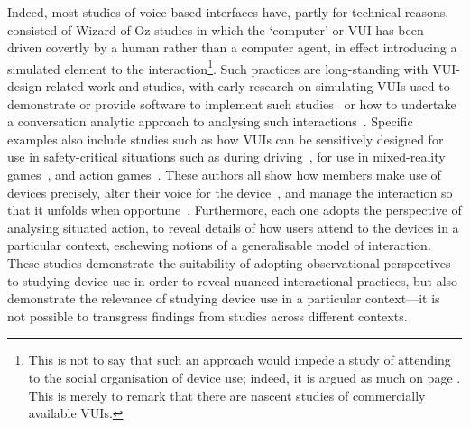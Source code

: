 Indeed, most studies of voice-based interfaces have, partly for technical reasons, consisted of Wizard of Oz studies in which the `computer' or \acf{VUI} has been driven covertly by a human rather than a computer agent, in effect introducing a simulated element to the interaction\footnote{This is not to say that such an approach would impede a study of attending to the social organisation of device use; indeed, it is argued as much on page \pageref{line:labsettings}. This is merely to remark that there are nascent studies of commercially available \acp{VUI}.}.
Such practices are long-standing with \ac{VUI}-design related work and studies, with early research on simulating \acp{VUI} used to demonstrate or provide software to implement such studies~\citep{Klemmer2000} or how to undertake a conversation analytic approach to analysing such interactions~\citep{Fraser1991,Wooffitt1994,Wooffitt1997}.
Specific examples also include studies such as how \acp{VUI} can be sensitively designed for use in safety-critical situations such as during driving~\citep{Martelaro2017}, for use in mixed-reality games~\citep{Dow2005}, and action games~\citep{Hoysniemi2004}.
These authors all show how members make use of devices precisely, alter their voice for the device~\citep{Pelikan2016}, and manage the interaction so that it unfolds when opportune~\citep{Martelaro2017}.
Furthermore, each one adopts the perspective of analysing situated action, to reveal details of how users attend to the devices in a particular context, eschewing notions of a generalisable model of interaction.
These studies demonstrate the suitability of adopting observational perspectives to studying device use in order to reveal nuanced interactional practices, but also demonstrate the relevance of studying device use in a particular context---it is not possible to transgress findings from studies across different contexts.






